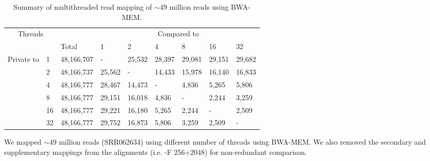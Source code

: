 \begin{table}[htb]
\caption{Summary of multithreaded read mapping of $\sim$49 million reads using BWA-MEM.}
\begin{center}
\begin{tabular}{|c|l|l|l|l|l|l|l|l|}
\hline
\multicolumn{2}{|c|}{\multirow{2}{*}{Threads}} &            & \multicolumn{6}{c|}{Compared to}                     \\
\cline{3-9}
\multicolumn{2}{|c|}{}                         & Total      & 1      & 2      & 4      & 8      & 16     & 32     \\
\hline
\multirow{6}{*}{Private to}       & 1        & 48,166,707 & -      & 25,532 & 28,397 & 29,081 & 29,151 & 29,682 \\
                                  & 2        & 48,166,737 & 25,562 & -      & 14,433 & 15,978 & 16,140 & 16,833 \\
                                  & 4        & 48,166,777 & 28,467 & 14,473 & -      & 4,836  & 5,265  & 5,806   \\
                                  & 8        & 48,166,777 & 29,151 & 16,018 & 4,836  & -      & 2,244  & 3,259   \\
                                  & 16       & 48,166,777 & 29,221 & 16,180 & 5,265  & 2,244  & -      & 2,509    \\
                                  & 32       & 48,166,777 & 29,752 & 16,873 & 5,806  & 3,259  & 2,509  & -     \\
\hline
\end{tabular}
\end{center}
{\footnotesize We mapped $\sim$49 million reads (SRR062634) using different number of threads using BWA-MEM.
We also removed the secondary and supplementary mappings from the alignments (i.e. -F 256+2048) for non-redundant comparison.
}
\label{supptab:threadmap}
\end{table}


